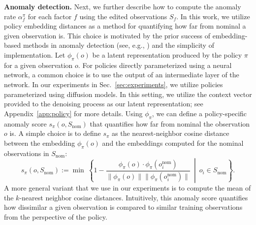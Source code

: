 

{\bf Anomaly detection.} Next, we further describe how to compute the anomaly rate $\alpha_f^\pi$ for each factor $f$ using the edited observations $S_f$. In this work, we utilize policy embedding distances as a method for quantifying how far from nominal a given observation is. This choice is motivated by the prior success of embedding-based methods in anomaly detection (see, e.g., \cite{sinha2024real, luo2024online}) and the simplicity of implementation. Let $\phi_\pi(o)$ be a latent representation produced by the policy $\pi$ for a given observation $o$. For policies directly parameterized using a neural network, a common choice is to use the output of an intermediate layer of the network. In our experiments in Sec.~\ref{sec:experiments}, we utilize policies parameterized using diffusion models. In this setting, we utilize the context vector provided to the denoising process as our latent representation; see Appendix~\ref{app:policy} for more details. Using $\phi_\pi$, we can define a policy-specific anomaly score $s_\pi(o, S_\text{nom})$ that quantifies how far from nominal the observation $o$ is. A simple choice is to define $s_\pi$ as the nearest-neighbor cosine distance between the embedding $\phi_\pi(o)$ and the embeddings computed for the nominal observations in $S_\text{nom}$:
\begin{equation}
s_\pi(o, S_\text{nom}) := \min \ \left\{ 1 - \frac{\phi_\pi(o) \cdot \phi_\pi(o_i^\text{nom})}{\|\phi_\pi(o)\| \|\phi_\pi(o_i^\text{nom})\|} \ \middle| \ o_i \in S_\text{nom} \right\}. 
\end{equation}
A more general variant that we use in our experiments is to compute the mean of the $k$-nearest neighbor cosine distances. Intuitively, this anomaly score quantifies how dissimilar a given observation is compared to similar training observations from the perspective of the policy. 

